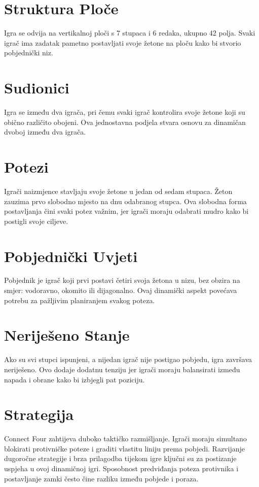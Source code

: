\documentclass[]{foi}
\begin{document}
\section{Struktura Ploče}

Igra se odvija na vertikalnoj ploči s 7 stupaca i 6 redaka, ukupno 42 polja. Svaki igrač ima zadatak pametno postavljati svoje žetone na ploču kako bi stvorio pobjednički niz.

\section{Sudionici}

Igra se između dva igrača, pri čemu svaki igrač kontrolira svoje žetone koji su obično različito obojeni. Ova jednostavna podjela stvara osnovu za dinamičan dvoboj između dva igrača.

\section{Potezi}

Igrači naizmjence stavljaju svoje žetone u jedan od sedam stupaca. Žeton zauzima prvo slobodno mjesto na dnu odabranog stupca. Ova slobodna forma postavljanja čini svaki potez važnim, jer igrači moraju odabrati mudro kako bi postigli svoje ciljeve.

\section{Pobjednički Uvjeti}

Pobjednik je igrač koji prvi postavi četiri svoja žetona u nizu, bez obzira na smjer: vodoravno, okomito ili dijagonalno. Ovaj dinamički aspekt povećava potrebu za pažljivim planiranjem svakog poteza.

\section{Neriješeno Stanje}

Ako su svi stupci ispunjeni, a nijedan igrač nije postigao pobjedu, igra završava neriješeno. Ovo dodaje dodatnu tenziju jer igrači moraju balansirati između napada i obrane kako bi izbjegli pat poziciju.

\section{Strategija}

Connect Four zahtijeva duboko taktičko razmišljanje. Igrači moraju simultano blokirati protivničke poteze i graditi vlastitu liniju prema pobjedi. Razvijanje dugoročne strategije i brza prilagodba tijekom igre ključni su za postizanje uspjeha u ovoj dinamičnoj igri. Sposobnost predviđanja poteza protivnika i postavljanje zamki često čine razliku između pobjede i poraza.
\end{document}
